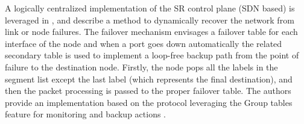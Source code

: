 A logically centralized implementation of the SR control plane (SDN based) is leveraged in \cite{segmentfor}, \cite{srdynamicrestoration} and \cite{reliablesr} describe a method to dynamically recover the network from link or node failures. 
The failover mechanism envisages a failover table for each interface of the node and when a port goes down automatically the related secondary table is used to implement a loop-free backup path from the point of failure to the destination node. Firstly, the node pops all the labels in the segment list except the last label (which represents the final destination), and then the packet processing is passed to the proper failover table. The authors provide an implementation based on the   protocol leveraging the  Group tables feature for monitoring and backup actions . %

